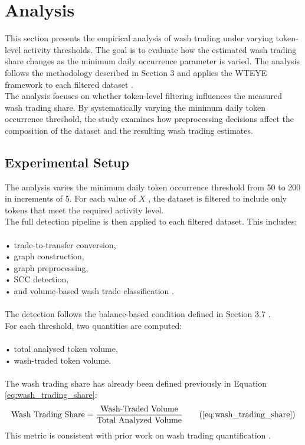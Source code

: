 \documentclass[language=english,thesis=bachelor,nosecondtitle,faculty=cb,onesided,13pt]{hsmw-thesis}
\begin{document}
\chapter{Analysis}
This section presents the empirical analysis of wash trading under varying token-level activity thresholds. The goal is to evaluate how the estimated wash trading share changes as the minimum daily occurrence parameter is varied. The analysis follows the methodology described in Section 3 and applies the WTEYE framework to each filtered dataset \cite{cui2023chain}.\\
The analysis focuses on whether token-level filtering influences the measured wash trading share. By systematically varying the minimum daily token occurrence threshold, the study examines how preprocessing decisions affect the composition of the dataset and the resulting wash trading estimates.
	\section{Experimental Setup}
The analysis varies the minimum daily token occurrence threshold from 50 to 200 in increments of 5. For each value of $X$ , the dataset is filtered to include only tokens that meet the required activity level.\\
The full detection pipeline is then applied to each filtered dataset. This includes:\\
\\
•	trade-to-transfer conversion,\\
•	graph construction,\\
•	graph preprocessing,\\
•	SCC detection,\\
•	and volume-based wash trade classification \cite{cui2023chain}.\\
\\
The detection follows the balance-based condition defined in Section 3.7 \cite{cui2023chain}.\\
For each threshold, two quantities are computed:\\
\\
•	total analysed token volume,\\
•	wash-traded token volume.\\
\\
The wash trading share has already been defined previously in Equation \ref{eq:wash_trading_share}:\\
\begin{equation}
    \text{Wash Trading Share} = \frac{\text{Wash-Traded Volume}}{\text{Total Analyzed Volume}}
    \tag{\ref{eq:wash_trading_share}}
\end{equation}
This metric is consistent with prior work on wash trading quantification \cite{victor2021detecting, cui2023chain}.
\end{document}
